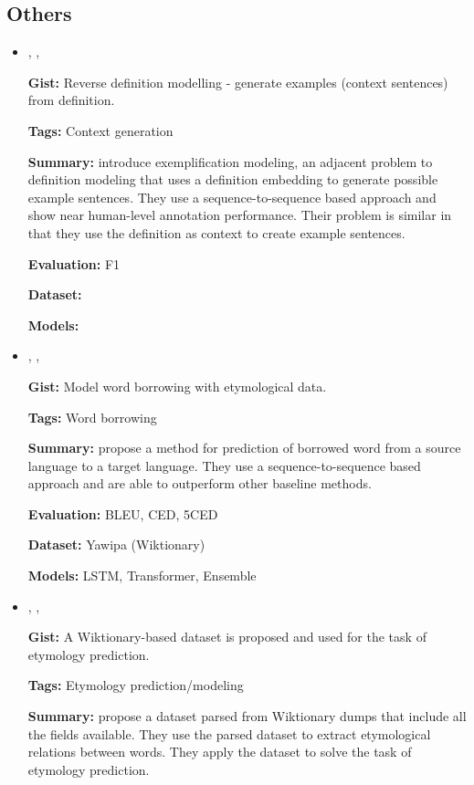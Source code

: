 \documentclass{article}[a4paper]
\newcommand{\bitem}[2]{
    \item[\cite{#1}]
        \citetitle{#1}, \citeauthor{#1}, \citeyear{#1}
        \newline
        {#2}
}%
\begin{document}
\subsection{Others}
\begin{itemize}
    \bitem{barba_exemplification_2021}%
    {%
        \textbf{Gist:}
        Reverse definition modelling - generate examples (context sentences)
        from definition.

        \textbf{Tags:}
        Context generation

        \textbf{Summary:}
        \citeauthor{barba_exemplification_2021} introduce exemplification
        modeling, an adjacent problem to definition modeling that uses a
        definition embedding to generate possible example sentences. They use a
        sequence-to-sequence based approach and show near human-level annotation
        performance. Their problem is similar in that they use the definition as
        context to create example sentences.

        \textbf{Evaluation:}
        F1

        \textbf{Dataset:}

        \textbf{Models:}

    }%

    \bitem{wu_2021_sequence}%
    {%
        \textbf{Gist:}
        Model word borrowing with etymological data.

        \textbf{Tags:}
        Word borrowing

        \textbf{Summary:}
        \citeauthor{wu_2021_sequence} propose a method for prediction of
        borrowed word from a source language to a target language. They use a
        sequence-to-sequence based approach and are able to outperform other
        baseline methods.

        \textbf{Evaluation:}
        BLEU, CED, 5CED

        \textbf{Dataset:}
        Yawipa (Wiktionary)

        \textbf{Models:}
        LSTM, Transformer, Ensemble
    }%

    \bitem{wu_computational_2020}%
    {%
        \textbf{Gist:}
        A Wiktionary-based dataset is proposed and used for the task of
        etymology prediction.

        \textbf{Tags:}
        Etymology prediction/modeling

        \textbf{Summary:}
        \citeauthor{wu_computational_2020} propose a dataset parsed from
        Wiktionary dumps that include all the fields available. They use the
        parsed dataset to extract etymological relations between words. They
        apply the dataset to solve the task of etymology prediction.

}
\end{itemize}
\end{document}
